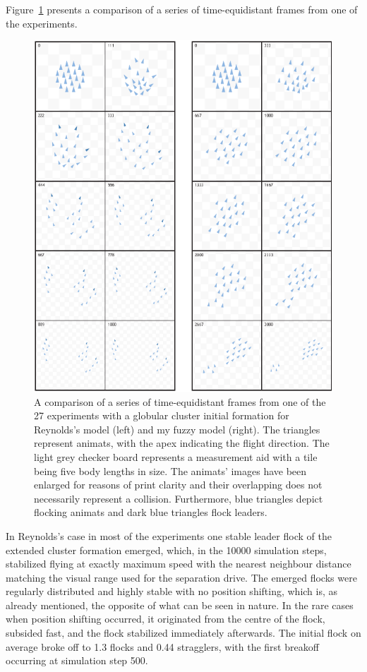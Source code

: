 Figure~\ref{fig:exp:02:14} presents a comparison of a series of time-equidistant frames from one of the experiments. 
%
\begin{figure}%
\null\vspace*{1mm}
\includegraphics{fig[exp0214]}
\par\vspace*{1mm}
\caption{A comparison of a series of time-equidistant frames from one of the 27 experiments with a globular cluster initial formation for Reynolds's model \cite{reynolds:1999} (left) and my fuzzy model (right). The triangles represent animats, with the apex indicating the flight direction. The light grey checker board represents a measurement aid with a tile being five body lengths in size. The animats' images have been enlarged for reasons of print clarity and their overlapping does not necessarily represent a collision. Furthermore, blue triangles depict flocking animats and dark blue triangles flock leaders.}
\label{fig:exp:02:14}
\end{figure}
%
In Reynolds's case in most of the experiments one stable leader flock of the extended cluster formation emerged, which, in the 10000 simulation steps, stabilized flying at exactly maximum speed with the nearest neighbour distance matching the visual range used for the separation drive. The emerged flocks were regularly distributed and highly stable with no position shifting, which is, as already mentioned, the opposite of what can be seen in nature. In the rare cases when position shifting occurred, it originated from the centre of the flock, subsided fast, and the flock stabilized immediately afterwards. The initial flock on average broke off to 1.3 flocks and 0.44 stragglers, with the first breakoff occurring at simulation step 500. 

